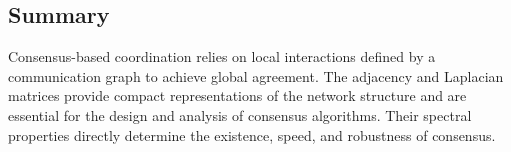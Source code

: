 \subsection{Summary}

Consensus-based coordination relies on local interactions defined by a communication graph to achieve global agreement.
The adjacency and Laplacian matrices provide compact representations of the network structure and are essential for the design and analysis of consensus algorithms.
Their spectral properties directly determine the existence, speed, and robustness of consensus.